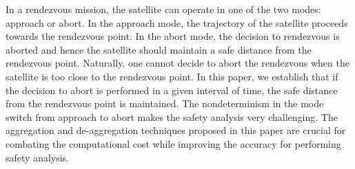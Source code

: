 %
In a rendezvous mission, the satellite can operate in one of the two modes: approach or abort. 
%
In the approach mode, the trajectory of the satellite proceeds towards the rendezvous point. 
%
In the abort mode, the decision to rendezvous is aborted and hence the satellite should maintain a safe distance from the rendezvous point. 
%
Naturally, one cannot decide to abort the rendezvous when the satellite is too close to the rendezvous point.
%
In this paper, we establish that if the decision to abort is performed in a given interval of time, the safe distance from the rendezvous point is maintained.
%
The nondeterminism in the mode switch from approach to abort makes the safety analysis very challenging.
%
The aggregation and de-aggregation techniques proposed in this paper are crucial for combating the computational cost while improving the accuracy for performing safety analysis.
%

